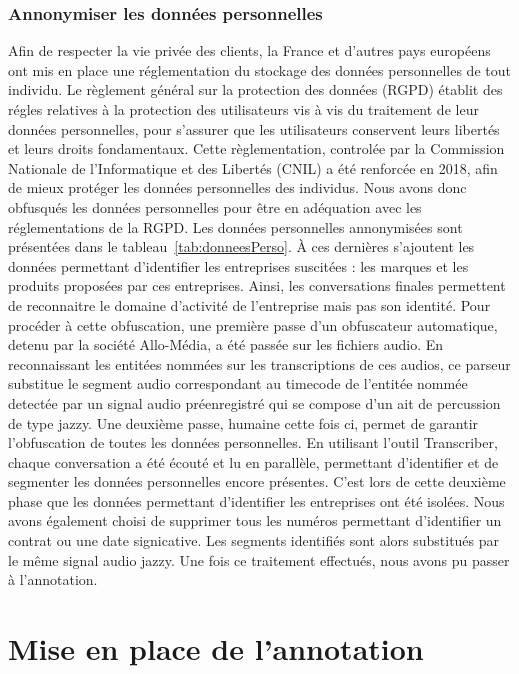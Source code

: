 \subsubsection{Annonymiser les données personnelles}
Afin de respecter la vie privée des clients, la France et d'autres pays européens ont mis en place une réglementation du stockage des données personnelles de tout individu. Le règlement général sur la protection des données (RGPD) établit des régles relatives à la protection des utilisateurs vis à vis du traitement de leur données personnelles, pour s'assurer que les utilisateurs conservent leurs libertés et leurs droits fondamentaux. Cette règlementation, controlée par la Commission Nationale de l'Informatique et des Libertés (CNIL) a été renforcée en 2018, afin de mieux protéger les données personnelles des individus.
Nous avons donc obfusqués les données personnelles pour être en adéquation avec les réglementations de la RGPD. Les données personnelles annonymisées sont présentées dans le tableau~\ref{tab:donneesPerso}. À ces dernières s'ajoutent les données permettant d'identifier les entreprises suscitées : les marques et les produits proposées par ces entreprises. Ainsi, les conversations finales permettent de reconnaitre le domaine d'activité de l'entreprise mais pas son identité.
Pour procéder à cette obfuscation, une première passe d'un obfuscateur automatique, detenu par la société Allo-Média, a été passée sur les fichiers audio. En reconnaissant les entitées nommées sur les transcriptions de ces audios, ce parseur substitue le segment audio correspondant au timecode de l'entitée nommée detectée par un signal audio préenregistré qui se compose d'un ait de percussion de type jazzy.
Une deuxième passe, humaine cette fois ci, permet de garantir l'obfuscation de toutes les données personnelles. En utilisant l'outil Transcriber, chaque conversation a été écouté et lu en parallèle, permettant d'identifier et de segmenter les données personnelles encore présentes. C'est lors de cette deuxième phase que les données permettant d'identifier les entreprises ont été isolées. Nous avons également choisi de supprimer tous les numéros permettant d'identifier un contrat ou une date signicative.
Les segments identifiés sont alors substitués par le même signal audio jazzy. Une fois ce traitement effectués, nous avons pu passer à l'annotation.

\section{Mise en place de l'annotation}

